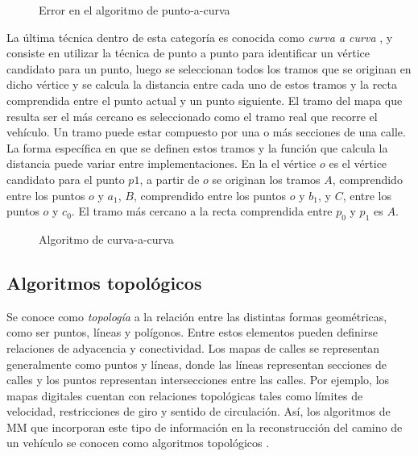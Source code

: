 \begin{figure}[h]
	\centering
	
	\caption{Error en el algoritmo de punto-a-curva}
	\label{fig:punto-a-curva} 
\end{figure}

La última técnica dentro de esta categoría es conocida como \emph{curva a curva} \cite{white2000some}, y consiste en  utilizar la técnica de punto a punto para identificar un vértice candidato para un punto, luego se seleccionan todos los tramos que se originan en dicho vértice y se calcula la distancia entre cada uno de estos tramos y la recta comprendida entre el punto actual y un punto siguiente. El tramo del mapa que resulta ser el más cercano es seleccionado como el tramo real que recorre el vehículo. Un tramo puede estar compuesto por una o más secciones de una calle. La forma específica en que se definen estos tramos y la función que calcula la distancia puede variar entre implementaciones. En la  el vértice $o$ es el vértice candidato para el punto $p1$, a partir de $o$ se originan los tramos $A$, comprendido entre los puntos $o$ y $a_1$, $B$, comprendido entre los puntos $o$ y $b_1$, y $C$, entre los puntos $o$ y $c_0$. El tramo más cercano a la recta comprendida entre $p_0$ y $p_1$ es $A$. 

\begin{figure}[h]
	\centering
	
	\caption{Algoritmo de curva-a-curva}
	\label{fig:curva-a-curva} 
\end{figure}

\subsection{Algoritmos topológicos}

Se conoce como \emph{topología} a la relación entre las distintas formas geométricas, como ser puntos, líneas y polígonos. Entre estos elementos pueden definirse relaciones de adyacencia y conectividad. Los mapas de calles se representan generalmente como puntos y líneas, donde las líneas representan secciones de calles y los puntos representan intersecciones entre las calles. Por ejemplo, los mapas digitales cuentan con relaciones topológicas tales como límites de velocidad, restricciones de giro y sentido de circulación. Así, los algoritmos de MM que incorporan este tipo de información en la reconstrucción del camino de un vehículo se conocen como algoritmos topológicos \cite{quddus2007current}.


